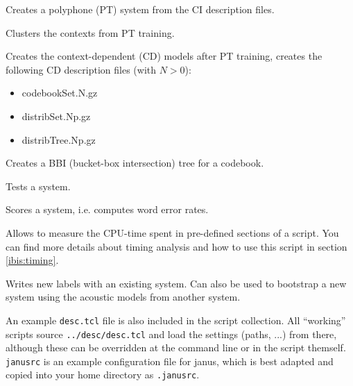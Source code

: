 \begin{description}
    \label{janus:makePT.tcl}

  Creates a polyphone (PT) system from the CI description files.

   \label{janus:cluster.tcl}

  Clusters the contexts from PT training.

     \label{janus:split.tcl}

  Creates the context-dependent (CD) models after PT training, creates
  the following CD description files (with $N > 0$):

  \begin{itemize}
    \item codebookSet.N.gz
    \item distribSet.Np.gz
    \item distribTree.Np.gz
  \end{itemize}

 \label{janus:createBBI.tcl}

  Creates a BBI (bucket-box intersection) tree for a codebook.

      \label{janus:test.tcl}

  Tests a system.

     \label{janus:score.tcl}
  
  Scores a system, i.e. computes word error rates.

  \label{janus:anatime.tcl}

  Allows to  measure the CPU-time  spent in  pre-defined sections of a
  script. You can find more details about timing analysis and how to use
  this script in section \ref{ibis:timing}.

    \label{janus:labels.tcl}

  Writes new labels with an existing system. Can also be used to
  bootstrap a new system using the acoustic models from another system.

\end{description}

An example  \texttt{desc.tcl}  file  is also  included in  the  script
collection.  All  ``working'' scripts source \texttt{../desc/desc.tcl}
and load the settings (paths, ...)  from there,  although these can be
overridden   at       the   command line        or   in   the   script
themself. \texttt{janusrc} is an example configuration file for janus,
which  is  best  adapted   and copied   into your home    directory as
\texttt{.janusrc}.

